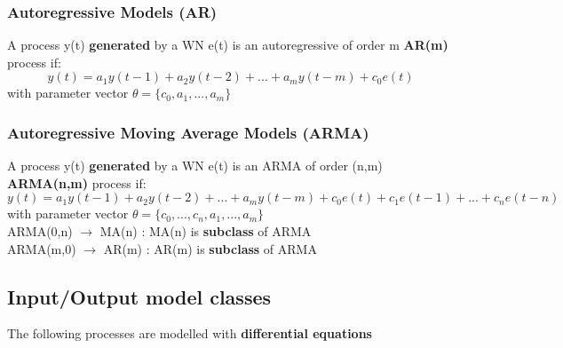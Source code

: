 \subsubsection{Autoregressive Models (AR)}
A process y(t) \textbf{generated} by a WN e(t) is an autoregressive of order m \textbf{AR(m)} process if:
$$ y(t) = a_1y(t-1)+a_2y(t-2)+...+a_my(t-m)+c_0e(t)$$ 
with parameter vector $ \theta = \{c_0,a_1,...,a_m\}$
\subsubsection{Autoregressive Moving Average Models (ARMA)}
A process y(t) \textbf{generated} by a WN e(t) is an ARMA of order (n,m) \textbf{ARMA(n,m)} process if:
$$ y(t) = a_1y(t-1)+a_2y(t-2)+...+a_my(t-m)+ c_0e(t)+c_1e(t-1)+...+c_ne(t-n)$$ 
with parameter vector $ \theta = \{c_0 ,...,c_n,a_1,...,a_m\}$\\
ARMA(0,n) $\to$ MA(n) : MA(n) is \textbf{subclass} of ARMA\\
ARMA(m,0) $\to$ AR(m) : AR(m) is \textbf{subclass} of ARMA

\newpage
\subsection{Input/Output model classes}
The following processes are modelled with \textbf{differential equations}

